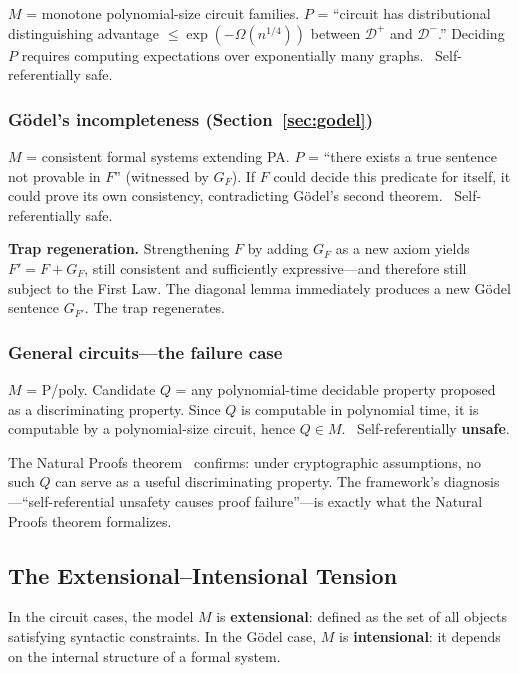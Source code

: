 \documentclass[11pt,a4paper]{article}
\theoremstyle{plain}
\theoremstyle{definition}
\theoremstyle{remark}
\begin{document}
$M$ = monotone polynomial-size circuit families. $P$ = ``circuit has distributional distinguishing advantage $\leq \exp(-\Omega(n^{1/4}))$ between $\mathcal{D}^+$ and $\mathcal{D}^-$.'' Deciding $P$ requires computing expectations over exponentially many graphs. \checkmark\ Self-referentially safe.

\subsubsection{G\"{o}del's incompleteness (Section~\ref{sec:godel})}

$M$ = consistent formal systems extending PA. $P$ = ``there exists a true sentence not provable in $F$'' (witnessed by $G_F$). If $F$ could decide this predicate for itself, it could prove its own consistency, contradicting G\"{o}del's second theorem. \checkmark\ Self-referentially safe.

\textbf{Trap regeneration.} Strengthening $F$ by adding $G_F$ as a new axiom yields $F' = F + G_F$, still consistent and sufficiently expressive---and therefore still subject to the First Law. The diagonal lemma immediately produces a new G\"{o}del sentence $G_{F'}$. The trap regenerates.

\subsubsection{General circuits---the failure case}

$M$ = P/poly. Candidate $Q$ = any polynomial-time decidable property proposed as a discriminating property. Since $Q$ is computable in polynomial time, it is computable by a polynomial-size circuit, hence $Q \in M$. \ Self-referentially \textbf{unsafe}.

The Natural Proofs theorem~\cite{RazborovRudich1994} confirms: under cryptographic assumptions, no such $Q$ can serve as a useful discriminating property. The framework's diagnosis---``self-referential unsafety causes proof failure''---is exactly what the Natural Proofs theorem formalizes.

\subsection{The Extensional--Intensional Tension}

In the circuit cases, the model $M$ is \textbf{extensional}: defined as the set of all objects satisfying syntactic constraints. In the G\"{o}del case, $M$ is \textbf{intensional}: it depends on the internal structure of a formal system.
\end{document}
